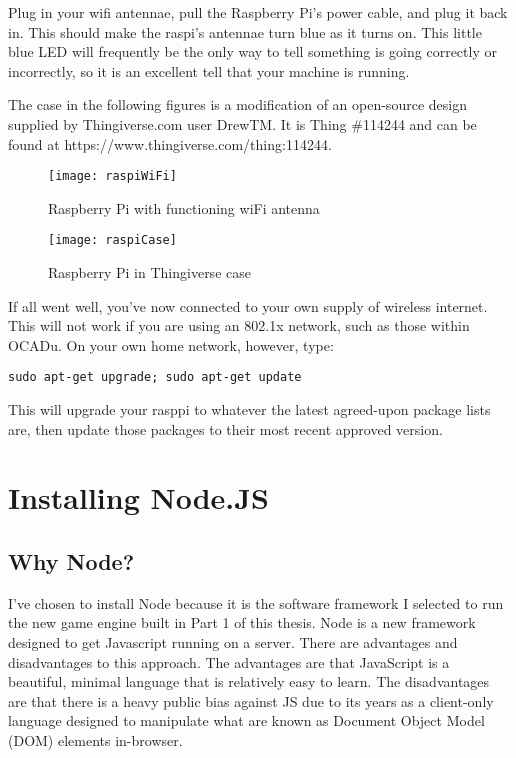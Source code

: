 Plug in your wifi antennae, pull the Raspberry Pi's power cable, and plug it back in. This should make the raspi's antennae turn blue as it turns on. This little blue LED will frequently be the only way to tell something is going correctly or incorrectly, so it is an excellent tell that your machine is running. 

The case in the following figures is a modification of an open-source design supplied by Thingiverse.com user DrewTM. It is Thing \#114244 and can be found at https://www.thingiverse.com/thing:114244.

\newpage
\begin{figure}[h!]
 \caption{Raspberry Pi with functioning wiFi antenna}
 \centering
  \texttt{[image: raspiWiFi]}
\end{figure}

\begin{figure}[h!]
 \caption{Raspberry Pi in Thingiverse case}
 \centering
  \texttt{[image: raspiCase]}
\end{figure}

\newpage

If all went well, you've now connected to your own supply of wireless internet. This will not work if you are using an 802.1x network, such as those within OCADu. On your own home network, however, type:

\begin{lstlisting}
sudo apt-get upgrade; sudo apt-get update
\end{lstlisting}

This will upgrade your rasppi to whatever the latest agreed-upon package lists are, then update those packages to their most recent approved version.

\section{Installing Node.JS}
\subsection{Why Node?}
I've chosen to install Node because it is the software framework I selected to run the new game engine built in Part 1 of this thesis. Node is a new framework designed to get Javascript running on a server. There are advantages and disadvantages to this approach. The advantages are that JavaScript is a beautiful, minimal language that is relatively easy to learn. The disadvantages are that there is a heavy public bias against JS due to its years as a client-only language designed to manipulate what are known as Document Object Model (DOM) elements in-browser.

